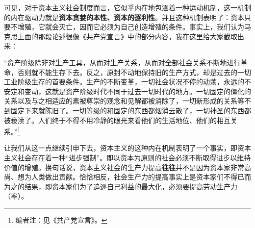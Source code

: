 \documentclass[a4paper,twoside,12pt,AutoFakeBold]{ctexart}
\begin{document}
可见，对于资本主义社会制度而言，它似乎内在地包涵着一种运动机制，这一机制的内在驱动力就是\textbf{资本贪婪的本性、资本的逐利性}。并且这种机制表明了：资本只要不增殖，它就会灭亡，因而它必须为自己创造增殖的条件。事实上，我们认为马克思上面的那段论述很像《共产党宣言》中的部分内容，我在这里给大家截取出来：
\begin{adjustwidth}{2em}{2em}
    \qquad\fangsong
    “资产阶级除非对生产工具，从而对生产关系，从而对全部社会关系不断地进行革命，否则就不能生存下去。反之，原封不动地保持旧的生产方式，却是过去的一切工业阶级生存的首要条件。生产的不断变革，一切社会状况不停的动荡，永远的不安定和变动，这就是资产阶级时代不同于过去一切时代的地方。一切固定的僵化的关系以及与之相适应的素被尊崇的观念和见解都被消除了，一切新形成的关系等不到固定下来就陈旧了。一切等级的和固定的东西都烟消云散了，一切神圣的东西都被亵渎了。人们终于不得不用冷静的眼光来看他们的生活地位、他们的相互关系。”\footnote{编者注：见《共产党宣言》。}
\end{adjustwidth}
\vspace{0.5cm}
让我们从这一点继续引申下去，资本主义的这种内在机制表明了一个事实，即资本主义社会存在着一种“进步强制”。即以资本为原则的社会必须不断取得进步以维持价值的增殖。换句话说，资本主义社会的生产力提高\textbf{往往}并不是因为资本家非常高尚、想为人类做出贡献。恰恰相反，社会生产力的提高事实上是资本家们不得已而为之的结果，即资本家们为了追逐自己利益的最大化，必须要提高劳动生产力（率）。
\end{document}
